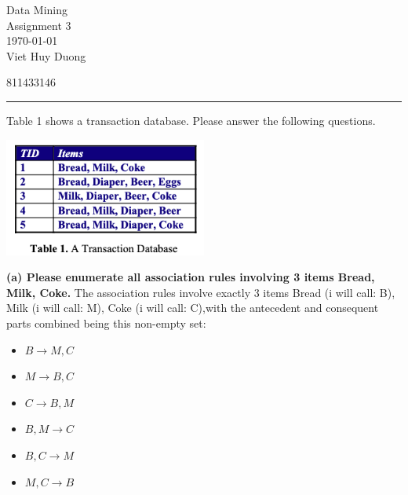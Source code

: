 \documentclass[12pt,letterpaper, onecolumn]{exam}
\begin{document}
\begingroup  
    \centering
    \LARGE Data Mining\\
    \LARGE Assignment 3\\[0.5em]
    \large \today\\[0.5em]
    \large Viet Huy Duong\par
    \large 811433146\par
\endgroup
\rule{\textwidth}{0.4pt}     
\pointsdroppedatright   %
\printanswers
\renewcommand{\solutiontitle}{\noindent\textbf{}}   %

\begin{questions}

    \question[10 pts] Table 1 shows a transaction database. Please answer the following questions. \droppoints

    \includegraphics[width=0.5\textwidth]{figure/P1.png}

    \newpage
    \begin{solution}


        \textbf{(a) Please enumerate all association rules involving 3 items Bread, Milk, Coke.}
        The association rules involve exactly 3 items {Bread (i will call: B), Milk (i will call: M), Coke (i will call: C)},with the antecedent and consequent parts combined being this non-empty set:
        
        \begin{itemize}
            \item \( B \rightarrow M, C \)
            \item \( M \rightarrow B, C \)
            \item \( C \rightarrow B, M \)
            \item \( B, M \rightarrow C \)
            \item \( B, C \rightarrow M \)
            \item \( M, C \rightarrow B \)
        \end{itemize}


\end{solution}
\end{questions}
\end{document}

